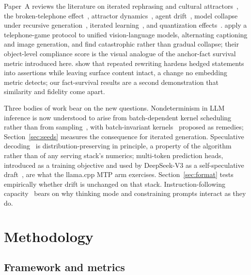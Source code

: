 \documentclass[11pt]{article}
\begin{document}
Paper~A reviews the literature on iterated rephrasing and cultural
attractors~\citep{perez2025cultural,brinkmann2023machine,acerbi2023content},
the broken-telephone effect~\citep{mohamed2025broken}, attractor
dynamics~\citep{wang2025attractor,chytas2025concept}, agent
drift~\citep{rath2026agent}, model collapse under recursive
generation~\citep{shumailov2024collapse,shumailov2023curse}, iterated
learning~\citep{kirby2008cumulative}, and quantization
effects~\citep{han2026quantization,hooper2024kvquant,liu2024kivi}.
\citet{mollah2025telephone} apply a telephone-game protocol to unified
vision-language models, alternating captioning and image generation, and
find catastrophic rather than gradual collapse; their object-level
compliance score is the visual analogue of the anchor-fact survival metric
introduced here. \citet{belem2026certainty} show that repeated rewriting
hardens hedged statements into assertions while leaving surface content
intact, a change no embedding metric detects; our fact-survival results are
a second demonstration that similarity and fidelity come apart.

Three bodies of work bear on the new questions. Nondeterminism in LLM
inference is now understood to arise from batch-dependent kernel
scheduling rather than from sampling~\citep{he2025nondeterminism}, with
batch-invariant kernels~\citep{zhang2025deterministic,zhao2026corun}
proposed as remedies; Section~\ref{sec:seeds} measures the consequence for
iterated generation. Speculative decoding~\citep{leviathan2023speculative,
chen2023speculative} is distribution-preserving in principle, a property of
the algorithm rather than of any serving stack's numerics; multi-token
prediction heads, introduced as a training objective
\citep{gloeckle2024multitoken} and used by DeepSeek-V3 as a self-speculative
draft~\citep{deepseek2024v3}, are what the llama.cpp MTP arm exercises.
Section~\ref{sec:format} tests empirically whether drift is unchanged on
that stack. Instruction-following
capacity~\citep{jaroslawicz2025ifscale} bears on why thinking mode and
constraining prompts interact as they do.

\section{Methodology}
\label{sec:method}

\subsection{Framework and metrics}
\label{sec:framework}
\end{document}
